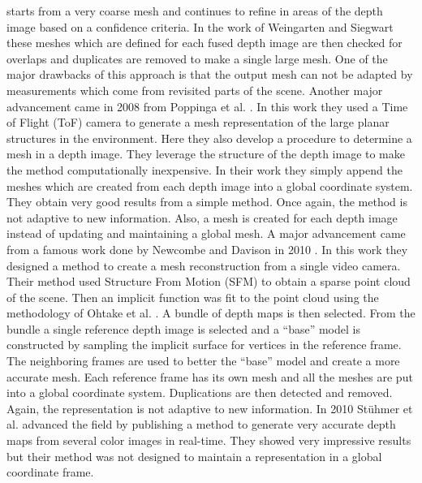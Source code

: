 starts from a very coarse mesh and continues to refine in areas of the
depth image based on a confidence criteria. In the work of Weingarten and
Siegwart these meshes which are defined for each fused depth image are then
checked for overlaps and duplicates are removed to make a single large
mesh. One of the major drawbacks of this approach is that the output mesh
can not be adapted by measurements which come from revisited parts of the
scene. Another major advancement came in 2008 from Poppinga et al.
\cite{Poppinga2008}. In this work they used a Time of Flight (ToF) camera
to generate a mesh representation of the large planar structures in the
environment. Here they also develop a procedure to determine a mesh in a
depth image. They leverage the structure of the depth image to make the
method computationally inexpensive. In their work they simply append the
meshes which are created from each depth image into a global coordinate
system. They obtain very good results from a simple method.  Once
again, the method is not adaptive to new information. Also, a mesh is
created for each depth image instead of updating and maintaining a global
mesh. A major advancement came from a famous work done by Newcombe and
Davison in 2010 \cite{Newcombe2010}. In this work they designed a method to
create a mesh reconstruction from a single video camera. Their method used
Structure From Motion (SFM) to obtain a sparse point cloud of the scene.
Then an implicit function was fit to the point cloud using the methodology
of Ohtake et al.  \cite{Ohtake2003}. A bundle of depth maps is then
selected. From the bundle a single reference depth image is selected and a
``base'' model is constructed by sampling the implicit surface for vertices
in the reference frame. The neighboring frames are used to better the
``base'' model and create a more accurate mesh. Each reference frame has
its own mesh and all the meshes are put into a global coordinate system.
Duplications are then detected and removed. Again, the representation is
not adaptive to new information. In 2010 St\"{u}hmer et al.
\cite{Stuhmer2010} advanced the field by publishing a method to generate
very accurate depth maps from several color images in real-time. They
showed very impressive results but their method was not designed to maintain
a representation in a global coordinate frame.

